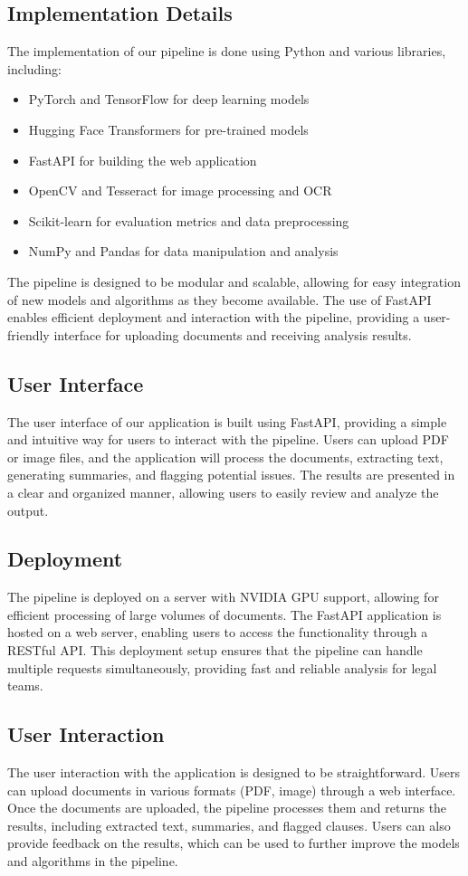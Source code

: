 \documentclass[conference]{IEEEtran}
\begin{document}
\subsection{Implementation Details}
The implementation of our pipeline is done using Python and various libraries, including:
\begin{itemize}
    \item PyTorch and TensorFlow for deep learning models
    \item Hugging Face Transformers for pre-trained models
    \item FastAPI for building the web application
    \item OpenCV and Tesseract for image processing and OCR
    \item Scikit-learn for evaluation metrics and data preprocessing
    \item NumPy and Pandas for data manipulation and analysis
\end{itemize}
The pipeline is designed to be modular and scalable, allowing for easy integration of new models and algorithms as they become available. The use of FastAPI enables efficient deployment and interaction with the pipeline, providing a user-friendly interface for uploading documents and receiving analysis results.
\subsection{User Interface}
The user interface of our application is built using FastAPI, providing a simple and intuitive way for users to interact with the pipeline. Users can upload PDF or image files, and the application will process the documents, extracting text, generating summaries, and flagging potential issues. The results are presented in a clear and organized manner, allowing users to easily review and analyze the output.
\subsection{Deployment}
The pipeline is deployed on a server with NVIDIA GPU support, allowing for efficient processing of large volumes of documents. The FastAPI application is hosted on a web server, enabling users to access the functionality through a RESTful API. This deployment setup ensures that the pipeline can handle multiple requests simultaneously, providing fast and reliable analysis for legal teams.
\subsection{User Interaction}
The user interaction with the application is designed to be straightforward. Users can upload documents in various formats (PDF, image) through a web interface. Once the documents are uploaded, the pipeline processes them and returns the results, including extracted text, summaries, and flagged clauses. Users can also provide feedback on the results, which can be used to further improve the models and algorithms in the pipeline.
\end{document}
